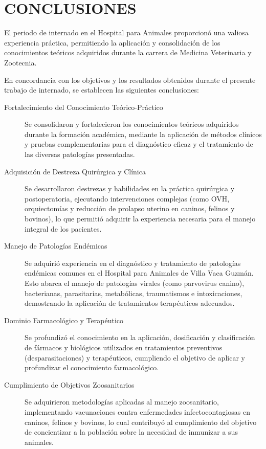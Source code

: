 \clearpage

\section{CONCLUSIONES}

El periodo de internado en el Hospital para Animales proporcionó una valiosa experiencia práctica, permitiendo la aplicación y consolidación de los conocimientos teóricos adquiridos durante la carrera de Medicina Veterinaria y Zootecnia.

En concordancia con los objetivos y los resultados obtenidos durante el presente trabajo de internado, se establecen las siguientes conclusiones:

\begin{description}
    \item[Fortalecimiento del Conocimiento Teórico-Práctico] Se consolidaron y fortalecieron los conocimientos teóricos adquiridos durante la formación académica, mediante la aplicación de métodos clínicos y pruebas complementarias para el diagnóstico eficaz y el tratamiento de las diversas patologías presentadas.

    \item[Adquisición de Destreza Quirúrgica y Clínica] Se desarrollaron destrezas y habilidades en la práctica quirúrgica y postoperatoria, ejecutando intervenciones complejas (como OVH, orquiectomías y reducción de prolapso uterino en caninos, felinos y bovinos), lo que permitió adquirir la experiencia necesaria para el manejo integral de los pacientes.

    \item[Manejo de Patologías Endémicas] Se adquirió experiencia en el diagnóstico y tratamiento de patologías endémicas comunes en el Hospital para Animales de Villa Vaca Guzmán. Esto abarca el manejo de patologías virales (como parvovirus canino), bacterianas, parasitarias, metabólicas, traumatismos e intoxicaciones, demostrando la aplicación de tratamientos terapéuticos adecuados.

    \item[Dominio Farmacológico y Terapéutico] Se profundizó el conocimiento en la aplicación, dosificación y clasificación de fármacos y biológicos utilizados en tratamientos preventivos (desparasitaciones) y terapéuticos, cumpliendo el objetivo de aplicar y profundizar el conocimiento farmacológico.

    \item[Cumplimiento de Objetivos Zoosanitarios] Se adquirieron metodologías aplicadas al manejo zoosanitario, implementando vacunaciones contra enfermedades infectocontagiosas en caninos, felinos y bovinos, lo cual contribuyó al cumplimiento del objetivo de concientizar a la población sobre la necesidad de inmunizar a sus animales.
\end{description}
